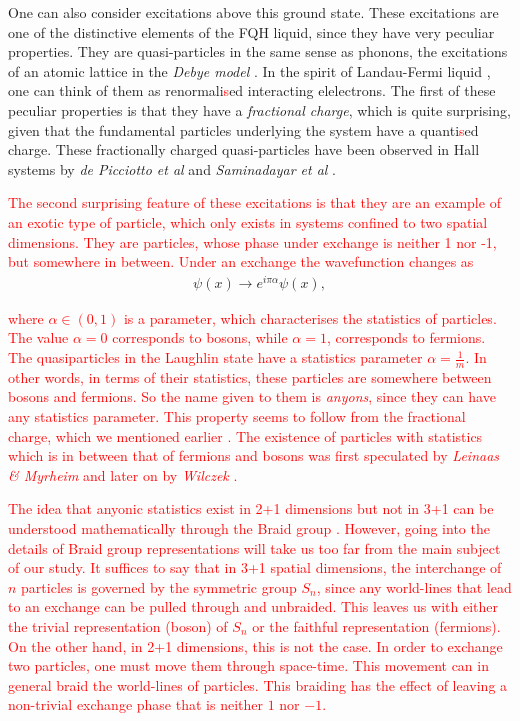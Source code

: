 One can also consider excitations above this ground state. These excitations are one of the distinctive elements of the FQH liquid, since they have very peculiar properties. They are quasi-particles in the same sense as phonons, the excitations of an atomic lattice in the \textit{Debye model} \cite{Debye1912}. In the spirit of Landau-Fermi liquid \cite{Landau:1956zuh}, one can think of them as renormali\textcolor{red}{s}ed interacting elelectrons. The first of these peculiar properties is that they have a \textit{fractional charge}, which is quite surprising, given that the fundamental particles underlying the system have a quanti\textcolor{red}{s}ed charge. These fractionally charged quasi-particles have been observed in Hall systems by \textit{de Picciotto et al} and \textit{Saminadayar et al} \cite{dePicciotto:1997qc, PhysRevLett.79.2526}.

 \textcolor{red}{The second surprising feature of these excitations is that they are an example of an exotic type of particle, which only exists in systems confined to two spatial dimensions. They are particles, whose phase under exchange is neither 1 nor -1, but somewhere in between. Under an exchange the wavefunction changes as}
\begin{align}
    \psi(x) \rightarrow e^{ i\pi  \alpha} \psi(x),
\end{align}

 \textcolor{red}{where $\alpha \in (0,1)$ is a parameter, which characteri\textcolor{red}{s}es the statistics of particles. The value $\alpha=0 $ corresponds to bosons, while $\alpha=1$, corresponds to fermions. The quasiparticles in the Laughlin state have a statistics parameter $\alpha = \frac{1}{m}$. In other words, in terms of their statistics, these particles are somewhere between bosons and fermions.  So the name given to them is \textit{anyons}, since they can have any statistics parameter. This property seems to follow from the fractional charge, which we mentioned earlier \cite{Halperin:1983zz, Wilczek:1981du}. The existence of particles with statistics which is in between that of fermions and bosons was first speculated by \textit{Leinaas \& Myrheim} \cite{Leinaas:1977fm} and later on by \textit{Wilczek} \cite{PhysRevLett.49.957}.}

 \textcolor{red}{The idea that anyonic statistics exist in 2+1 dimensions but not in 3+1 can be understood mathematically through the Braid group \cite{PhysRevLett.52.2103, Artin1947}. However, going into the details of Braid group representations will take us too far from the main subject of our study. It suffices to say that in 3+1 spatial dimensions, the interchange of $n$ particles is governed by the symmetric group $S_n$, since any world-lines that lead to an exchange can be pulled through and unbraided. This leaves us with either the trivial representation (boson) of $S_n$ or the faithful representation (fermions). On the other hand, in 2+1 dimensions, this is not the case. In order to exchange two particles, one must move them through space-time. This movement can in general braid the world-lines of particles. This braiding has the effect of leaving a non-trivial exchange phase that is neither $1$ nor $-1$.}


